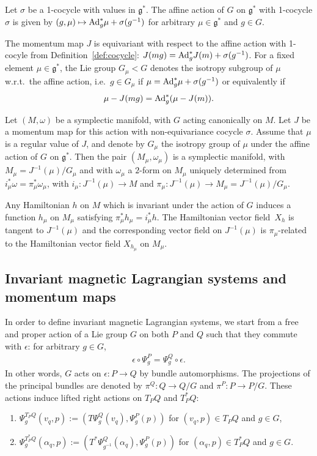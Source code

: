 \documentclass[pdftex]{sigma}
\newcommand{\e}{\epsilon}
\newcommand{\lag}{\mathfrak{g}}
\begin{document}
\begin{definition} Let $\sigma$ be a 1-cocycle with values in $\lag^*$. The af\/f\/ine action of $G$ on $\lag^*$ with 1-cocycle $\sigma$ is given by $(g,\mu)\mapsto {\rm Ad}^*_{g}\mu +\sigma(g^{-1})$ for arbitrary $\mu\in\lag^*$ and $g\in G$.
\end{definition}
The momentum map $J$ is equivariant with respect to the af\/f\/ine action with 1-cocyle from Definition~\ref{def:cocycle}: $J(mg)= {\rm Ad}_g^* J(m)+ \sigma(g^{-1})$. For a f\/ixed element $\mu\in\lag^*$, the Lie group $G_\mu<G$ denotes the isotropy subgroup of $\mu$ w.r.t.\ the af\/f\/ine action, i.e.\ $g\in G_\mu$ if $\mu = {\rm Ad}_{g}^*\mu + \sigma(g^{-1})$ or equivalently if \[\mu - J(mg) = {\rm Ad}_g^*(\mu - J(m)).\]

\begin{theorem}\label{thm:mw}
Let $(M,\omega)$ be a symplectic manifold, with $G$ acting canonically on $M$. Let $J$ be a momentum map for this action with non-equivariance cocycle $\sigma$. Assume that $\mu$ is a regular value of $J$, and denote by $G_\mu$ the isotropy group of $\mu$ under the affine action of $G$ on $\lag^*$. Then the pair $(M_\mu,\omega_\mu)$ is a symplectic manifold, with $M_\mu = J^{-1}(\mu)/G_\mu$ and with $\omega_\mu$ a $2$-form on $M_\mu$ uniquely determined from $i^*_\mu \omega=\pi_\mu^*\omega_\mu$, with  $i_\mu:J^{-1}(\mu)\to M$ and $\pi_\mu: J^{-1}(\mu)\to M_\mu=J^{-1}(\mu)/G_\mu$.

Any Hamiltonian $h$ on $M$ which is invariant under the action of $G$ induces a function $h_\mu$ on $M_\mu$ satisfying $\pi_\mu^*h_\mu = i^*_\mu h$. The Hamiltonian vector field~$X_h$ is tangent to $J^{-1}(\mu)$ and the corresponding vector field on $J^{-1}(\mu)$ is $\pi_\mu$-related to the Hamiltonian vector field $X_{h_\mu}$ on $M_\mu$.
\end{theorem}


\subsection{Invariant magnetic Lagrangian systems and momentum maps}\label{section4.2}
In order to def\/ine invariant magnetic Lagrangian systems, we start from a free and proper action of a Lie group $G$ on both $P$ and $Q$ such that they commute with $\e$: for arbitrary $g\in G$,
\begin{gather}\label{compatiblea}\e\circ\Psi^P_g=\Psi^Q_g\circ\e.\end{gather}
In other words, $G$ acts on $\epsilon: P \to Q$ by bundle automorphisms.
The projections of the principal bundles are denoted by $\pi^Q:Q\to Q/G$ and $\pi^P:P\to P/G$.
These actions induce lifted right actions on $T_PQ$ and $T_P^*Q$:
\begin{enumerate}\itemsep=0pt
\item[1)] $\Psi^{T_PQ}_g(v_q,p):= (T\Psi^Q_g(v_q),\Psi^P_g(p))$ for $(v_q,p)\in T_PQ$ and $g\in G$,
\item[2)] $\Psi^{T^*_PQ}_g(\alpha_q,p):= (T^*\Psi^Q_{g^{-1}}(\alpha_q),\Psi^P_g(p))$ for $(\alpha_q,p)\in T^*_PQ$ and $g\in G$.
\end{enumerate}
\end{document}
